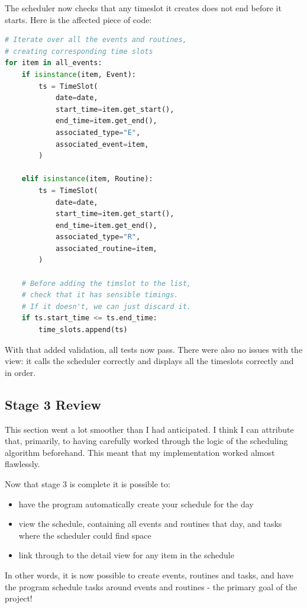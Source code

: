 \documentclass{article}
\begin{document}
The scheduler now checks that any timeslot it creates does not end before it starts.
Here is the affected piece of code:
\begin{lstlisting}[language=Python]
# Iterate over all the events and routines,
# creating corresponding time slots
for item in all_events:
    if isinstance(item, Event):
        ts = TimeSlot(
            date=date,
            start_time=item.get_start(),
            end_time=item.get_end(),
            associated_type="E",
            associated_event=item,
        )

    elif isinstance(item, Routine):
        ts = TimeSlot(
            date=date,
            start_time=item.get_start(),
            end_time=item.get_end(),
            associated_type="R",
            associated_routine=item,
        )

    # Before adding the timslot to the list,
    # check that it has sensible timings.
    # If it doesn't, we can just discard it.
    if ts.start_time <= ts.end_time:
        time_slots.append(ts)
\end{lstlisting}

With that added validation,
all tests now pass.
There were also no issues with the view:
it calls the scheduler correctly and displays all the timeslots correctly and in order.

\subsection{Stage 3 Review}
This section went a lot smoother than I had anticipated.
I think I can attribute that, primarily,
to having carefully worked through the logic of the scheduling algorithm beforehand.
This meant that my implementation worked almost flawlessly.

Now that stage 3 is complete it is possible to:
\begin{samepage}
	\begin{itemize}
		\item have the program automatically create your schedule for the day
		\item view the schedule,
		      containing all events and routines that day,
		      and tasks where the scheduler could find space
		\item link through to the detail view for any item in the schedule
	\end{itemize}
\end{samepage}

In other words,
it is now possible to create events, routines and tasks,
and have the program schedule tasks around events and routines -
the primary goal of the project!
\end{document}
